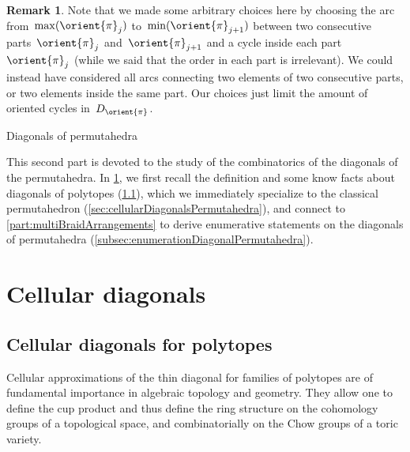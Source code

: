 \documentclass{amsart}
\makeatletter
\newcommand{\vincent}[1]{\todo[color=blue!30]{\rm #1 \\ \hfill --- V.}}
\theoremstyle{definition}
\newtheorem{remark}[theorem]{Remark}
\def\part{\@startsection{part}{1}%
\z@{.7\linespacing\@plus\linespacing}{.8\linespacing}%
{\LARGE\sffamily\centering}}
\makeatother
\begin{document}
\begin{remark}
Note that we made some arbitrary choices here by choosing the arc from~$\max(\orient{\pi}_j)$ to~$\min(\orient{\pi}_{j+1})$ between two consecutive parts~$\orient{\pi}_j$ and~$\orient{\pi}_{j+1}$ and a cycle inside each part~$\orient{\pi}_j$ (while we said that the order in each part is irrelevant).
We could instead have considered all arcs connecting two elements of two consecutive parts, or two elements inside the same part.
Our choices just limit the amount of oriented cycles in~$D_{\orient{\pi}}$.
\end{remark}


\clearpage
\part{Diagonals of permutahedra}
\label{part:diagonalsPermutahedra}

This second part is devoted to the study of the combinatorics of the diagonals of the permutahedra.
In \cref{sec:cellularDiagonals}, we first recall the definition and some know facts about diagonals of polytopes (\cref{subsec:cellularDiagonalsPolytopes}), which we immediately specialize to the classical permutahedron (\cref{sec:cellularDiagonalsPermutahedra}), and connect to \cref{part:multiBraidArrangements} to derive enumerative statements on the diagonals of permutahedra (\cref{subsec:enumerationDiagonalPermutahedra}).

\vincent{To complete}


\section{Cellular diagonals}
\label{sec:cellularDiagonals}


\subsection{Cellular diagonals for polytopes}
\label{subsec:cellularDiagonalsPolytopes}
 
Cellular approximations of the thin diagonal for families of polytopes are of fundamental importance in algebraic topology and geometry.
They allow one to define the cup product and thus define the ring structure on the cohomology groups of a topological space, and combinatorially on the Chow groups of a toric variety. 
\end{document}
